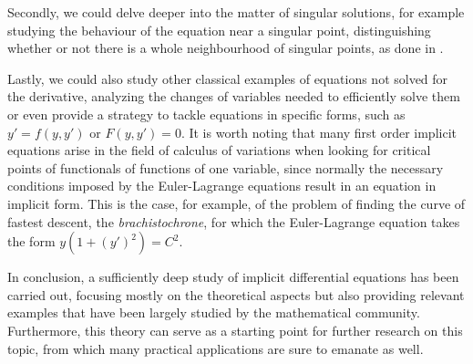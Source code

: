 Secondly, we could delve deeper into the matter of singular solutions, for example studying the behaviour of the equation near a singular point, distinguishing whether or not there is a whole neighbourhood of singular points, as done in \cite{rabier1989implicit}.

Lastly, we could also study other classical examples of equations not solved for the derivative, analyzing the changes of variables needed to efficiently solve them or even provide a strategy to tackle equations in specific forms, such as $y'=f(y,y')$ or $F(y,y')=0$. It is worth noting that many first order implicit equations arise in the field of calculus of variations when looking for critical points of functionals of functions of one variable, since normally the necessary conditions imposed by the Euler-Lagrange equations result in  an equation in implicit form. This is the case, for example, of the problem of finding the curve of fastest descent, the \textit{brachistochrone}, for which the Euler-Lagrange equation takes the form $y(1+(y')^2)=C^2$.

In conclusion, a sufficiently deep study of implicit differential equations has been carried out, focusing mostly on the theoretical aspects but also providing relevant examples that have been largely studied by the mathematical community. Furthermore, this theory can serve as a starting point for further research on this topic, from which many practical applications are sure to emanate as well.
